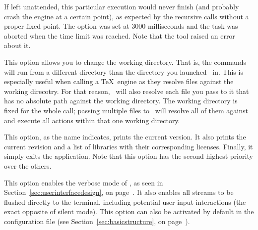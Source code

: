 \begin{description}

If left unattended, this particular execution would never finish (and probably crash the engine at a certain point), as expected by the recursive calls without a proper fixed point. The  option was set at 3000 milliseconds and the task was aborted when the time limit was reached. Note that the tool raised an error about it.

\item[\describeop{d}{working-directory}] This option allows you to change the working directory. That is, the commands will run from a different directory than the directory you launched \arara\ in. This is especially useful when calling a \TeX\ engine as they resolve files against the working direcotry. For that reason, \arara\ will also resolve each file you pass to it that has no absolute path against the working directory. The working directory is fixed for the whole call; passing multiple files to \arara\ will resolve all of them against and execute all actions within that one working directory.

\item[\describeop{V}{version}] This option, as the name indicates, prints the current version. It also prints the current revision and a list of libraries with their corresponding licenses. Finally, it simply exits the application. Note that this option has the second highest priority over the others.

\item[\describeop{v}{verbose}] This option enables the verbose mode of \arara, as seen in Section~\ref{sec:userinterfacedesign}, on page~\pageref{sec:userinterfacedesign}. It also enables all streams to be flushed directly to the terminal, including potential user input interactions (the exact opposite of silent mode). This option can also be activated by default in the configuration file (see Section~\ref{sec:basicstructure}, on page~\pageref{sec:basicstructure}).


\end{description}
